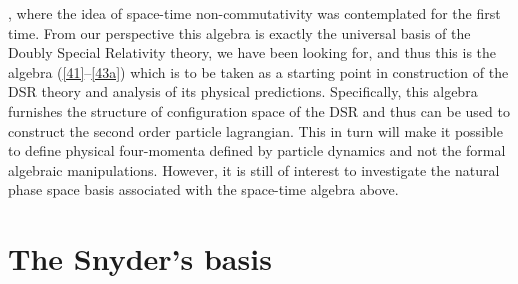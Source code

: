 \documentclass [prd,twocolumn,nofootinbib,showpacs]  {revtex4}
\begin{document}
\cite{snyder}, where the idea of space-time non-commutativity was
contemplated for the first time.  From our perspective this
algebra is exactly the universal basis of the Doubly Special
Relativity theory, we have been looking for, and thus this is the
algebra (\ref{41}--\ref{43a}) which is to be taken as a starting
point in construction of the DSR theory and analysis of its
physical predictions. Specifically, this algebra furnishes the
structure of configuration space of the DSR and thus can be used
to construct the second order particle lagrangian. This in turn
will make it possible to define physical four-momenta defined by
particle dynamics and not the formal algebraic manipulations.
However, it is still of interest to investigate the natural phase
space basis associated with the space-time algebra above.

\section{The Snyder's basis}
\end{document}
